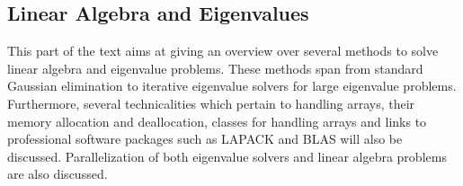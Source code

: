 % 
%
%

\begin{partbacktext}
\part{Linear Algebra and Eigenvalues}
This part of the text aims at giving an overview over several methods 
to solve linear algebra and eigenvalue problems. These methods span from
standard Gaussian elimination to iterative eigenvalue solvers for large 
eigenvalue problems. 
Furthermore, several technicalities which pertain to handling arrays, their memory allocation and deallocation, classes for handling arrays
and links to professional software packages such as LAPACK and BLAS will also be discussed. Parallelization of both eigenvalue solvers and linear algebra problems are also discussed.

\end{partbacktext}
